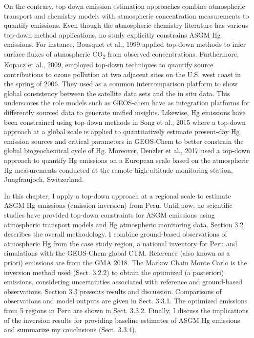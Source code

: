 \begin{flushleft}
On the contrary, top-down emission estimation approaches combine atmospheric transport and chemistry models with atmospheric concentration measurements to quantify emissions. Even though the atmospheric chemistry literature has various top-down method applications, no study explicitly constrains ASGM Hg emissions. For instance, Bousquet et al., 1999 applied top-down methods to infer surface fluxes of atmospheric CO\textsubscript{2} from observed concentrations\cite{bousquet_inverse_1999}. Furthermore, Kopacz et al., 2009, employed top-down techniques to quantify source contributions to ozone pollution at two adjacent sites on the U.S. west coast in the spring of 2006\cite{kopacz_global_2010}. They used  \gc as a common intercomparison platform to show global consistency between the satellite data sets and the in situ data. This underscores the role models such as GEOS-chem have as integration platforms for differently sourced data to generate unified insights. Likewise, Hg emissions have been constrained using top-down methods in Song et al., 2015 where a top-down approach at a global scale is applied to quantitatively estimate present-day Hg emission sources and critical parameters in GEOS-Chem to better constrain the global biogeochemical cycle of Hg\cite{song_top-down_2015}. Moreover, Denzler et al., 2017 used a top-down approach to quantify Hg emissions on a European scale based on the atmospheric Hg measurements conducted at the remote high-altitude monitoring station, Jungfraujoch, Switzerland\cite{denzler_inversion_2017}. 
\end{flushleft}
\begin{flushleft}
In this chapter, I apply a top-down approach at a regional scale to estimate ASGM Hg emissions (emission inversion) from Peru. Until now, no scientific studies have provided top-down constraints for ASGM emissions using atmospheric transport models and Hg atmospheric monitoring data. Section 3.2 describes the overall methodology. I combine ground-based observations of atmospheric Hg from the case study region\cite{koenig_seasonal_2021}, a national inventory for Peru\cite{artisanal_gold_council_reporte_2017} and simulations with the GEOS-Chem global CTM. Reference (also known as a priori) emissions are from the GMA 2018\cite{steenhuisen_development_2019,united_nations_environment_programme_technical_2019}. The Markov Chain Monte Carlo is the inversion method used (Sect. 3.2.2) to obtain the optimized (a posteriori) emissions, considering uncertainties associated with reference and ground-based observations. Section 3.3 presents results and discussion. Comparisons of observations and model outputs are given in Sect. 3.3.1. The optimized emissions from 5 regions in Peru are shown in Sect. 3.3.2. Finally, I discuss the implications of the inversion results for providing baseline estimates of ASGM Hg emissions  and summarize my conclusions (Sect. 3.3.4).

\end{flushleft}
\newpage
